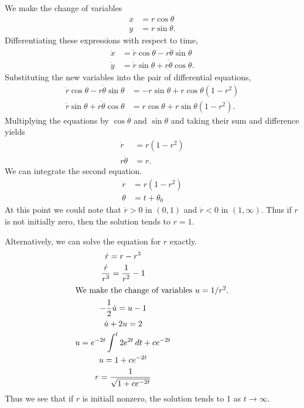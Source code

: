 \begin{Solution}
  We make the change of variables
  \begin{align*}
    x       &= r \cos \theta \\
    y       &= r \sin \theta.
  \end{align*}
  Differentiating these expressions with respect to time,
  \begin{align*}
    \dot{x} &= \dot{r} \cos \theta - r \dot{\theta} \sin \theta \\
    \dot{y} &= \dot{r} \sin \theta + r \dot{\theta} \cos \theta.
  \end{align*}
  Substituting the new variables into the pair of differential equations,
  \begin{align*}
    \dot{r} \cos \theta - r \dot{\theta} \sin \theta 
    &= -r \sin \theta + r \cos \theta (1-r^2) \\
    \dot{r} \sin \theta + r \dot{\theta} \cos \theta
    &= r \cos \theta + r \sin \theta(1-r^2).
  \end{align*}
  Multiplying the equations by $\cos \theta$ and $\sin \theta$ and taking their
  sum and difference yields
  \begin{align*}
    \dot{r} &= r(1-r^2) \\
    r \dot{\theta} &= r.
  \end{align*}
  We can integrate the second equation.
  \begin{align*}
    \dot{r} &= r(1-r^2) \\
    \theta      &= t + \theta_0
  \end{align*}
  At this point we could note that $\dot{r} > 0$ in $(0,1)$ and $\dot{r} < 0$
  in $(1,\infty)$.  Thus if $r$ is not initially zero, then the solution tends
  to $r=1$.

  Alternatively, we can solve the equation for $r$ exactly.
  \begin{gather*}
    \dot{r} = r - r^3 \\
    \frac{\dot{r}}{r^3} = \frac{1}{r^2} - 1 \\
    \intertext{We make the change of variables $u = 1/r^2$.}
    -\frac{1}{2} \dot{u} = u - 1 \\
    \dot{u} + 2 u = 2 \\
    u = e^{-2t} \int^t 2 e^{2t} \,d t + c e^{-2t} \\
    u = 1 + c e^{-2t} \\
    r = \frac{1}{\sqrt{1 + c e^{-2t}}}
  \end{gather*}
  Thus we see that if $r$ is initiall nonzero, the solution tends to 1 as 
  $t \to \infty$.
\end{Solution}



